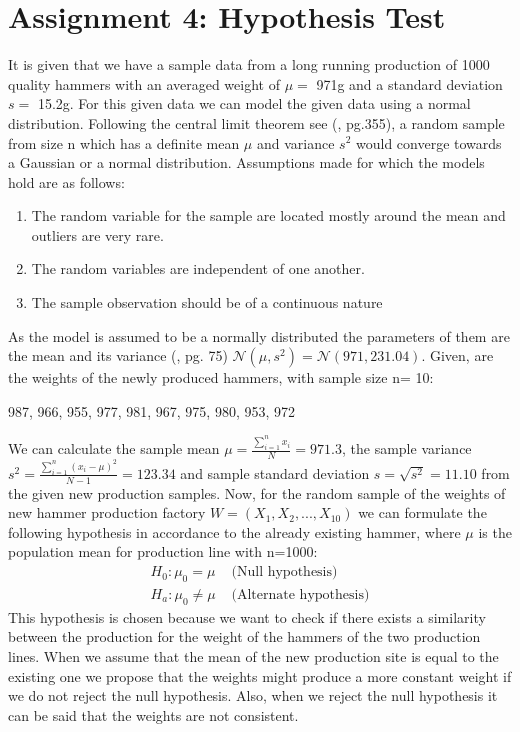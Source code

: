 \chapter{Assignment 4: Hypothesis Test}
It is given that we have a sample data from a long running production of 1000 quality hammers with an averaged weight of $\mu =$ 971g and a standard deviation $s= $ 15.2g. For this given data we can model the given data using a normal distribution. Following the central limit theorem see (\cite{hogg:2005}, pg.355), a random sample from size n which has a definite mean $\mu $ and variance $s^2$ would converge towards a Gaussian or a normal distribution. Assumptions made for which the models hold are as follows:
\begin{enumerate}
    \item The random variable for the sample are located mostly around the mean and outliers are very rare.
    \item The random variables are independent of one another.
    \item The sample observation should be of a continuous nature
\end{enumerate}
As the model is assumed to be a normally distributed the parameters of them are the mean and its variance (\cite{Iubh:2021}, pg. 75) $\mathcal{N}(\mu, s^2) = \mathcal{N}(971, 231.04)$.\newline
Given, are the weights of the newly produced hammers, with sample size n= 10:
\begin{center}
    987, 966, 955, 977, 981, 967, 975, 980, 953, 972
\end{center} 
We can calculate the sample mean $\mu = \frac{\sum_{i=1}^{n}x_i}{N}=971.3$, the sample variance $s^2=\frac{\sum_{i=1}^{n}(x_i-\mu)^2}{N-1} = 123.34$ and sample standard deviation $s=\sqrt{s^2}=11.10$ from the given new production samples.
Now, for the random sample of the weights of new hammer production factory $W = (X_1, X_2, ..., X_{10})$ we can formulate the following hypothesis in accordance to the already existing hammer, where $\mu$ is the population mean for production line with n=1000:\newline
\begin{equation}
    \begin{split}
      H_0 : \mu_0 = \mu& \text{ (Null hypothesis)}\\
      H_a: \mu_0 \neq \mu& \text{ (Alternate hypothesis)}
    \end{split}
\end{equation}
This hypothesis is chosen because we want to check if there exists a similarity between the production for the weight of the hammers of the two production lines. When we assume that the mean of the new production site is equal to the existing one we propose that the weights might produce a more constant weight if we do not reject the null hypothesis. Also, when we reject the null hypothesis it can be said that the weights are not consistent.\newline\newline
